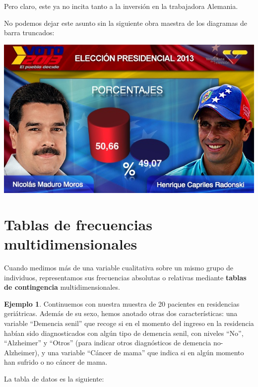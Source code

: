 \documentclass[
]{book}
\theoremstyle{definition}
\theoremstyle{definition}
\newtheorem{example}{Ejemplo}[chapter]
\theoremstyle{definition}
\theoremstyle{definition}
\theoremstyle{remark}
\begin{document}
Pero claro, este ya no incita tanto a la inversión en la trabajadora Alemania.

\begin{rmdromans}
No podemos dejar este asunto sin la siguiente obra maestra de los diagramas de barra truncados:
\end{rmdromans}

\begin{center}\includegraphics[width=0.75\linewidth]{INREMDN_files/figure-html/vene1} \end{center}

\hypertarget{tablas-de-frecuencias-multidimensionales}{%
\section{Tablas de frecuencias multidimensionales}\label{tablas-de-frecuencias-multidimensionales}}

Cuando medimos más de una variable cualitativa sobre un mismo grupo de individuos, representamos sus frecuencias absolutas o relativas mediante \textbf{tablas de contingencia} multidimensionales.

\begin{example}
\protect\hypertarget{exm:sexoger2}{}\label{exm:sexoger2}Continuemos con nuestra muestra de 20 pacientes en residencias geriátricas.
Además de su sexo, hemos anotado otras dos características: una variable ``Demencia senil'' que recoge si en el momento del ingreso en la residencia habían sido diagnosticados con algún tipo de demencia senil, con niveles ``No'', ``Alzheimer'' y ``Otros'' (para indicar otros diagnósticos de demencia no-Alzheimer), y una variable ``Cáncer de mama'' que indica si en algún momento han sufrido o no cáncer de mama.
\end{example}

La tabla de datos es la siguiente:
\end{document}

